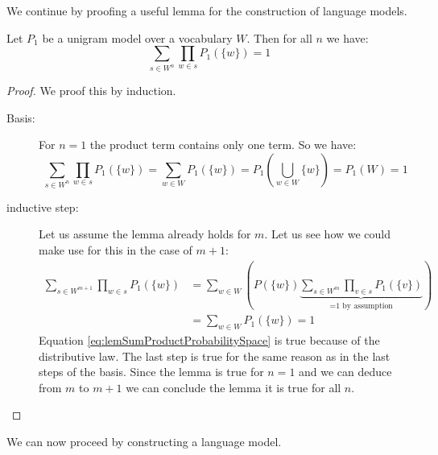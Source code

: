 \documentclass[•]{book}
\begin{document}
We continue by proofing a useful lemma for the construction of language models. 

\begin{lemma}\label{lem:sumProductProbabilitySpace}
Let $P_1$ be a unigram model over a vocabulary $W$. Then for all $n$ we have:
\[
\sum_{s\in W^n}\prod_{w\in s}P_1(\{w\}) =1
\]
\end{lemma}
\begin{proof}
We proof this by induction.
\begin{description}
\item[Basis:] For $n=1$ the product term contains only one term. So we have:
\[
\sum_{s\in W^n}\prod_{w\in s}P_1(\{w\}) = \sum_{w\in W}P_1(\{w\}) = P_1(\bigcup_{w\in W}\{w\}) = P_1(W) =  1
\]

\item[inductive step:] Let us assume the lemma already holds for $m$. Let us see how we could make use for this in the case of $m+1$:
\begin{align}
 \sum_{s\in W^{m+1}}\prod_{w\in s}P_1(\{w\}) & = \sum_{w\in W}\left(P(\{w\})\underbrace{ \sum_{s\in W^m}\prod_{v\in s}P_1(\{v\}) } _{\text{=1 by assumption}}\right) \label{eq:lemSumProductProbabilitySpace}  \\
 &= \sum_{w\in W}P_1(\{w\}) = 1
\end{align}
Equation \ref{eq:lemSumProductProbabilitySpace} is true because of the distributive law.
The last step is true for the same reason as in the last steps of the basis.
Since the lemma is true for $n=1$ and we can deduce from $m$ to $m+1$ we can conclude the lemma it is true for all $n$.
\end{description}
\end{proof}


We can now proceed by constructing a language model.
\end{document}
